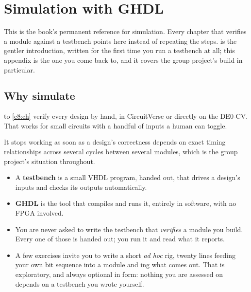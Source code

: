 
\chapter{Simulation with GHDL}
\label{app:sim}

This is the book's permanent reference for simulation. Every chapter that verifies a module against a
testbench points here instead of repeating the steps.  is the gentler
introduction, written for the first time you run a testbench at all; this appendix is the one you come
back to, and it covers the group project's build in particular.

\section{Why simulate}
\label{app:sim:why}

 to \ref{c8:ch} verify every design by hand, in CircuitVerse or directly on the
DE0-CV. That works for small circuits with a handful of inputs a human can toggle.

It stops working as soon as a design's correctness depends on exact timing relationships across
several cycles between several modules, which is the group project's situation throughout.

\begin{itemize}
  \item A \textbf{testbench} is a small VHDL program, handed out, that drives a design's inputs and
    checks its outputs automatically.
  \item \textbf{GHDL} is the tool that compiles and runs it, entirely in software, with no FPGA
    involved.
  \item You are never asked to write the testbench that \emph{verifies} a module you build. Every one
    of those is handed out; you run it and read what it reports.
  \item A few exercises invite you to write a short \emph{ad hoc} rig, twenty lines feeding your own
    bit sequence into a module and ing what comes out. That is exploratory, and always
    optional in form: nothing you are assessed on depends on a testbench you wrote yourself.
\end{itemize}

